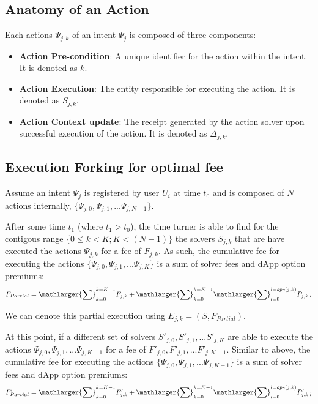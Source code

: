 \subsection{Anatomy of an Action}
Each actions $\Psi_{j, k}$ of an intent $\Psi_j$ is composed of three components:
\begin{itemize}
    \item \textbf{Action Pre-condition}: A unique identifier for the action within the intent. It is denoted as $k$.
    \item \textbf{Action Execution}: The entity responsible for executing the action. It is denoted as $S_{j, k}$.
    \item \textbf{Action Context update}: The receipt generated by the action solver upon successful execution of the action. It is denoted as $\Delta_{j, k}$.
\end{itemize}

\subsection{Execution Forking for optimal fee}

Assume an intent $\Psi_j$ is registered by user $U_i$ at time $t_0$ and is composed of $N$ actions internally, $\{\Psi_{j, 0}, \Psi_{j, 1}, ... \Psi_{j, N-1}\}$. 

After some time $t_1$ (where $t_1 > t_0$), the time turner is able to find for the contigous range $\{0 \leq k < K; K < (N-1)\}$ the solvers $S_{j, k}$ that are have executed the actions $\Psi_{j, k}$ for a fee of $F_{j, k}$. As such, the cumulative fee for executing the actions $\{\Psi_{j, 0}, \Psi_{j, 1}, ... \Psi_{j, K}\}$ is a sum of solver fees and dApp option premiums: 
$$
F_{Partial} = \mathlarger{\sum}_{k = 0}^{k = K-1}F_{j, k} + \mathlarger{\sum}_{k = 0}^{k = K-1}  \mathlarger{\sum}_{l = 0}^{l = ops(j, k)} P_{j, k, l}
$$

We can denote this partial execution using $E_{j, k} = (S, F_{Partial})$.

At this point, if a different set of solvers $S'_{j, 0}, S'_{j, 1}, ... S'_{j, K}$ are able to execute the actions $\Psi_{j, 0}, \Psi_{j, 1}, ... \Psi_{j, K-1}$ for a fee of $F'_{j, 0}, F'_{j, 1}, ... F'_{j, K-1}$. Similar to above, the cumulative fee for executing the actions $\{\Psi_{j, 0}, \Psi_{j, 1}, ... \Psi_{j, K-1}\}$ is a sum of solver fees and dApp option premiums:
$$
F'_{Partial} = \mathlarger{\sum}_{k = 0}^{k = K-1}F'_{j, k} + \mathlarger{\sum}_{k = 0}^{k = K-1} \mathlarger{\sum}_{l = 0}^{l = ops(j, k)}P'_{j, k, l}
$$


